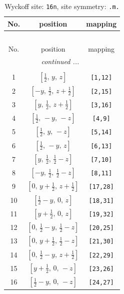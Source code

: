 \documentclass[fleqn,8pt]{jsarticle}
\begin{document}
\renewcommand{\arraystretch}{1.2}
\begin{longtable}{ccc}
\caption{Wyckoff site: {\tt 16n}, site symmetry: {\tt .m.}}
 \\
 \hline \hline
No. & position & mapping \\ \hline \endfirsthead

\multicolumn{2}{l}{\tablename\ \thetable{}} \\
 \hline \hline
No. & position & mapping \\ \hline \endhead

 \hline \hline
\multicolumn{2}{r}{\footnotesize\it continued ...} \\ \endfoot

 \hline \hline
\multicolumn{2}{r}{} \\ \endlastfoot

1 & $\left[ \frac{1}{2},\, y,\, z \right]$ & {\tt [1,12]} \\ \hline
2 & $\left[ - y,\, \frac{1}{2},\, z + \frac{1}{2} \right]$ & {\tt [2,15]} \\ \hline
3 & $\left[ y,\, \frac{1}{2},\, z + \frac{1}{2} \right]$ & {\tt [3,16]} \\ \hline
4 & $\left[ \frac{1}{2},\, - y,\, - z \right]$ & {\tt [4,9]} \\ \hline
5 & $\left[ \frac{1}{2},\, y,\, - z \right]$ & {\tt [5,14]} \\ \hline
6 & $\left[ \frac{1}{2},\, - y,\, z \right]$ & {\tt [6,13]} \\ \hline
7 & $\left[ y,\, \frac{1}{2},\, \frac{1}{2} - z \right]$ & {\tt [7,10]} \\ \hline
8 & $\left[ - y,\, \frac{1}{2},\, \frac{1}{2} - z \right]$ & {\tt [8,11]} \\ \hline
9 & $\left[ 0,\, y + \frac{1}{2},\, z + \frac{1}{2} \right]$ & {\tt [17,28]} \\ \hline
10 & $\left[ \frac{1}{2} - y,\, 0,\, z \right]$ & {\tt [18,31]} \\ \hline
11 & $\left[ y + \frac{1}{2},\, 0,\, z \right]$ & {\tt [19,32]} \\ \hline
12 & $\left[ 0,\, \frac{1}{2} - y,\, \frac{1}{2} - z \right]$ & {\tt [20,25]} \\ \hline
13 & $\left[ 0,\, y + \frac{1}{2},\, \frac{1}{2} - z \right]$ & {\tt [21,30]} \\ \hline
14 & $\left[ 0,\, \frac{1}{2} - y,\, z + \frac{1}{2} \right]$ & {\tt [22,29]} \\ \hline
15 & $\left[ y + \frac{1}{2},\, 0,\, - z \right]$ & {\tt [23,26]} \\ \hline
16 & $\left[ \frac{1}{2} - y,\, 0,\, - z \right]$ & {\tt [24,27]} \\
\end{longtable}
\end{document}
